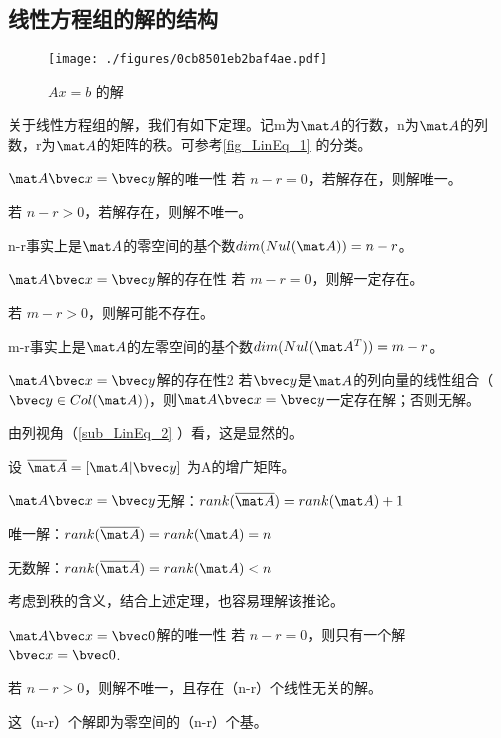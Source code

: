 \subsection{线性方程组的解的结构}
\begin{figure}[ht]
\centering
\texttt{[image: ./figures/0cb8501eb2baf4ae.pdf]}
\caption{$Ax=b$ 的解} \label{fig_LinEq_1}
\end{figure}


关于线性方程组的解，我们有如下定理。记m为$\mat A$的行数，n为$\mat A$的列数，r为$\mat A$的矩阵的秩。可参考\autoref{fig_LinEq_1} 的分类。

\begin{theorem}{$\mat A \bvec x=\bvec y$解的唯一性}
若 $n-r=0$，若解存在，则解唯一。

若 $n-r>0$，若解存在，则解不唯一。
\end{theorem}
n-r事实上是$\mat A$的零空间的基个数$dim(Nul(\mat A))=n-r$。

\begin{theorem}{$\mat A \bvec x=\bvec y$解的存在性}
若 $m-r=0$，则解一定存在。

若 $m-r>0$，则解可能不存在。
\end{theorem}
m-r事实上是$\mat A$的左零空间的基个数$dim(Nul(\mat A^T))=m-r$。

\begin{theorem}{$\mat A \bvec x=\bvec y$解的存在性2}
若$\bvec y$是$\mat A$的列向量的线性组合（$\bvec y \in Col(\mat A)$)，则$\mat A \bvec x=\bvec y$一定存在解；否则无解。
\end{theorem}
由列视角（\autoref{sub_LinEq_2} ）看，这是显然的。

\begin{corollary}{}
设 $\overline{\mat A} = [\mat A | \bvec y] $ 为A的增广矩阵。

$\mat A \bvec x=\bvec y$无解：$rank(\overline{\mat A})=rank(\mat A)+1$

唯一解：$rank(\overline{\mat A})=rank(\mat A)=n$

无数解：$rank(\overline{\mat A})=rank(\mat A)<n$
\end{corollary}
考虑到秩的含义，结合上述定理，也容易理解该推论。

\begin{theorem}{$\mat A \bvec x=\bvec 0$解的唯一性}
若 $n-r=0$，则只有一个解 $\bvec x = \bvec 0$.

若 $n-r>0$，则解不唯一，且存在（n-r）个线性无关的解。
\end{theorem}
这（n-r）个解即为零空间的（n-r）个基。


